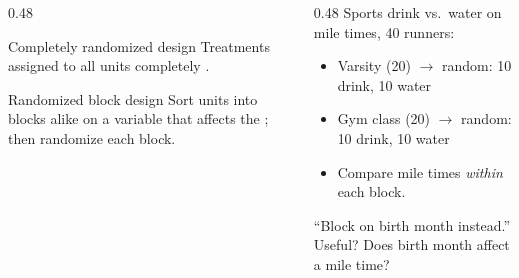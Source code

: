 \documentclass[aspectratio=169, 11pt]{beamer}
\begin{document}
\begin{frame}[t, plain]
  \vspace{2pt}
  \begin{columns}[t]
    \begin{column}{0.48\textwidth}
      \begin{block}{Completely randomized design}
        Treatments assigned to all units completely .
      \end{block}
      \vspace{3pt}
      \begin{block}{Randomized block design}
        Sort units into blocks alike on a variable that affects the ; then
        randomize  each block.
      \end{block}
    \end{column}
    \begin{column}{0.48\textwidth}
      {\small Sports drink vs.\ water on mile times, 40 runners:}
      \begin{itemize}\setlength{\itemsep}{3pt}\small
        \item Varsity (20) $\to$ random: 10 drink, 10 water
        \item Gym class (20) $\to$ random: 10 drink, 10 water
        \item Compare mile times \emph{within} each block.
      \end{itemize}
      \vspace{6pt}
      {\small ``Block on birth month instead.'' Useful? Does birth month affect a mile time?}
    \end{column}
  \end{columns}
\end{frame}
\end{document}
